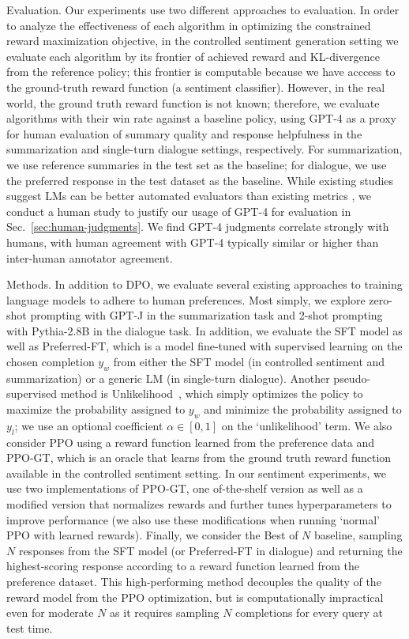 \documentclass{article}
\begin{document}
Evaluation. Our experiments use two different approaches to evaluation. In order to analyze the effectiveness of each algorithm in optimizing the constrained reward maximization objective, in the controlled sentiment generation setting we evaluate each algorithm by its frontier of achieved reward and KL-divergence from the reference policy; this frontier is computable because we have acccess to the ground-truth reward function (a sentiment classifier). However, in the real world, the ground truth reward function is not known; therefore, we evaluate algorithms with their win rate against a baseline policy, using GPT-4 as a proxy for human evaluation of summary quality and response helpfulness in the summarization and single-turn dialogue settings, respectively. For summarization, we use reference summaries in the test set as the baseline; for dialogue, we use the preferred response in the test dataset as the baseline. While existing studies suggest LMs can be better automated evaluators than existing metrics \citep{Chen2023ExploringTU}, we conduct a human study to justify our usage of GPT-4 for evaluation in Sec.~\ref{sec:human-judgments}. We find GPT-4 judgments correlate strongly with humans, with human agreement with GPT-4 typically similar or higher than inter-human annotator agreement.

Methods. In addition to DPO, we evaluate several existing approaches to training language models to adhere to human preferences. Most simply, we explore zero-shot prompting with GPT-J \citep{gpt-j} in the summarization task and 2-shot prompting with Pythia-2.8B \citep{biderman2023pythia} in the dialogue task. In addition, we evaluate the SFT model as well as Preferred-FT, which is a model fine-tuned with supervised learning on the chosen completion $y_w$ from either the SFT model (in controlled sentiment and summarization) or a generic LM (in single-turn dialogue). Another pseudo-supervised method is Unlikelihood~\citep{welleck2019neural}, which simply optimizes the policy to maximize the probability assigned to $y_w$ and minimize the probability assigned to $y_l$; we use an optional coefficient $\alpha\in[0,1]$ on the `unlikelihood' term. We also consider PPO \citep{schulman2017proximal} using a reward function learned from the preference data and PPO-GT, which is an oracle that learns from the ground truth reward function available in the controlled sentiment setting. In our sentiment experiments, we use two implementations of PPO-GT, one of-the-shelf version \cite{leandro_von_werra_2023_7790115} as well as a modified version that normalizes rewards and further tunes hyperparameters to improve performance (we also use these modifications when running `normal' PPO with learned rewards). Finally, we consider the Best of $N$ baseline, sampling $N$ responses from the SFT model (or Preferred-FT in dialogue) and returning the highest-scoring response according to a reward function learned from the preference dataset. This high-performing method decouples the quality of the reward model from the PPO optimization, but is computationally impractical even for moderate $N$ as it requires sampling $N$ completions for every query at test time.
\end{document}
